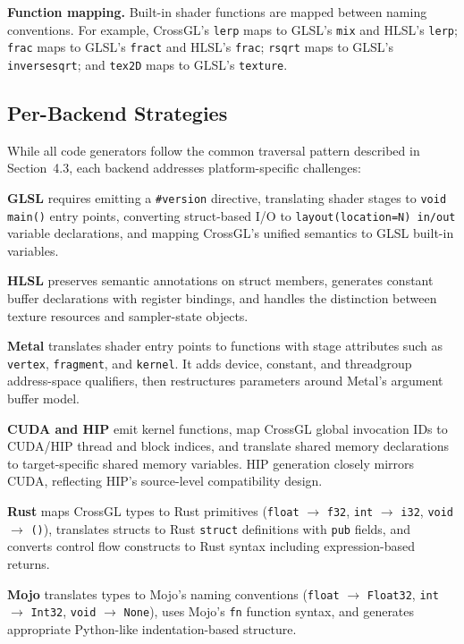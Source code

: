 \documentclass{svproc}
\begin{document}
\textbf{Function mapping.} Built-in shader functions are mapped between naming conventions. For example, CrossGL's \texttt{lerp} maps to GLSL's \texttt{mix} and HLSL's \texttt{lerp}; \texttt{frac} maps to GLSL's \texttt{fract} and HLSL's \texttt{frac}; \texttt{rsqrt} maps to GLSL's \texttt{inversesqrt}; and \texttt{tex2D} maps to GLSL's \texttt{texture}.

\subsection{Per-Backend Strategies}

While all code generators follow the common traversal pattern described in Section~4.3, each backend addresses platform-specific challenges:

\textbf{GLSL} requires emitting a \texttt{\#version} directive, translating shader stages to \texttt{void main()} entry points, converting struct-based I/O to \texttt{layout(location=N) in/out} variable declarations, and mapping CrossGL's unified semantics to GLSL built-in variables.

\textbf{HLSL} preserves semantic annotations on struct members, generates constant buffer declarations with register bindings, and handles the distinction between texture resources and sampler-state objects.

\textbf{Metal} translates shader entry points to functions with stage attributes such as \texttt{vertex}, \texttt{fragment}, and \texttt{kernel}. It adds device, constant, and threadgroup address-space qualifiers, then restructures parameters around Metal's argument buffer model.

\textbf{CUDA and HIP} emit kernel functions, map CrossGL global invocation IDs to CUDA/HIP thread and block indices, and translate shared memory declarations to target-specific shared memory variables. HIP generation closely mirrors CUDA, reflecting HIP's source-level compatibility design.

\textbf{Rust} maps CrossGL types to Rust primitives (\texttt{float} $\rightarrow$ \texttt{f32}, \texttt{int} $\rightarrow$ \texttt{i32}, \texttt{void} $\rightarrow$ \texttt{()}), translates structs to Rust \texttt{struct} definitions with \texttt{pub} fields, and converts control flow constructs to Rust syntax including expression-based returns.

\textbf{Mojo} translates types to Mojo's naming conventions (\texttt{float} $\rightarrow$ \texttt{Float32}, \texttt{int} $\rightarrow$ \texttt{Int32}, \texttt{void} $\rightarrow$ \texttt{None}), uses Mojo's \texttt{fn} function syntax, and generates appropriate Python-like indentation-based structure.
\end{document}
